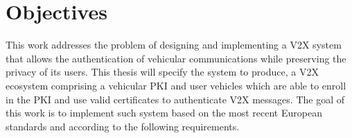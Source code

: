 \section{Objectives}
\label{goals}

This work addresses the problem of designing and implementing a V2X system that allows the authentication of vehicular communications while preserving the privacy of its users. This thesis will specify the system to produce, a V2X ecosystem comprising a vehicular PKI and user vehicles which are able to enroll in the PKI and use valid certificates to authenticate V2X messages. The goal of this work is to implement such system based on the most recent European standards and according to the 
following requirements.

